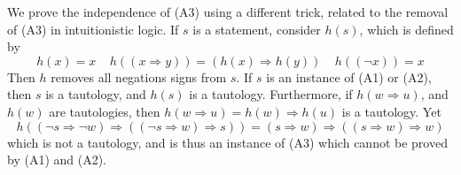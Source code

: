 We prove the independence of (A3) using a different trick, related to the removal of (A3) in intuitionistic logic. If $s$ is a statement, consider $h(s)$, which is defined by
%
\[ h(x) = x\ \ \ \ \ h((x \Rightarrow y)) = (h(x) \Rightarrow h(y))\ \ \ \ \ h((\neg x)) = x \]
%
Then $h$ removes all negations signs from $s$. If $s$ is an instance of (A1) or (A2), then $s$ is a tautology, and $h(s)$ is a tautology. Furthermore, if $h(w \Rightarrow u)$, and $h(w)$ are tautologies, then $h(w \Rightarrow u) = h(w) \Rightarrow h(u)$ is a tautology. Yet
%
\[ h((\neg s \Rightarrow \neg w) \Rightarrow ((\neg s \Rightarrow w) \Rightarrow s)) = (s \Rightarrow w) \Rightarrow((s \Rightarrow w) \Rightarrow w) \]
%
which is not a tautology, and is thus an instance of (A3) which cannot be proved by (A1) and (A2).









































